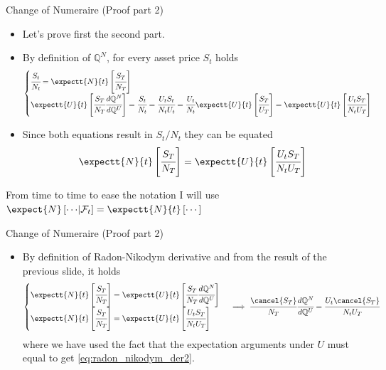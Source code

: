 \documentclass{beamer}
\begin{document}
\begin{frame}{Change of Numeraire (Proof part 2)}
	\begin{itemize}
		\item Let's prove first the second part.
		\item By definition of $\mathbb{Q}^N$, for every asset price $S_t$ holds
		\begin{equation*}
			\begin{cases}
				\cfrac{S_t}{N_t} = \expectt{N}{t}\left[\cfrac{S_T}{N_T}\right] \\
				\expectt{U}{t}\left[\cfrac{S_T}{N_T}\cfrac{d\mathbb{Q}^N}{d\mathbb{Q}^U}\right] = \cfrac{S_t}{N_t} = \cfrac{U_t S_t}{N_t U_t}
				= \cfrac{U_t}{N_t}\expectt{U}{t}\left[\cfrac{S_T}{U_T}\right] = \expectt{U}{t}\left[\cfrac{U_t S_T}{N_t U_T}\right]
			\end{cases}
		\end{equation*}
		\item Since both equations result in $S_t/N_t$ they can be equated
		\begin{equation*}
			\expectt{N}{t}\left[\cfrac{S_T}{N_T}\right] = \expectt{U}{t}\left[\cfrac{U_t S_T}{N_t U_T}\right]
		\end{equation*}
	\end{itemize}
	\vfill
	\begin{tcolorbox}[colback=gray!5, colframe=maincolor, arc=0mm, boxrule=0.5pt]
		\footnotesize
		From time to time to ease the notation I will use $\expect{N}\left[\cdots \middle| \mathcal{F}_t\right] = \expectt{N}{t}\left[\cdots\right]$
	\end{tcolorbox}
\end{frame}

\begin{frame}{Change of Numeraire (Proof part 2)}
	\begin{itemize}
		\item By definition of Radon-Nikodym derivative and from the result of the previous slide, it holds
		\begin{equation*}
			\begin{cases}
				\expectt{N}{t}\left[\cfrac{S_T}{N_T}\right] =\expectt{U}{t}\left[\cfrac{S_T}{N_T} \cfrac{d\mathbb{Q}^N}{d\mathbb{Q}^U}\right] \\
				\expectt{N}{t}\left[\cfrac{S_T}{N_T}\right] =\expectt{U}{t}\left[\cfrac{U_t S_T}{N_t U_T}\right]
			\end{cases}\implies
			\cfrac{\cancel{S_T}}{N_T} \cfrac{d\mathbb{Q}^N}{d\mathbb{Q}^U} = \cfrac{U_t \cancel{S_T}}{N_t U_T}
		\end{equation*}
		where we have used the fact that the expectation arguments under $U$ must equal to get \cref{eq:radon_nikodym_der2}.
	\end{itemize}
	\myendproof
\end{frame}
\end{document}
